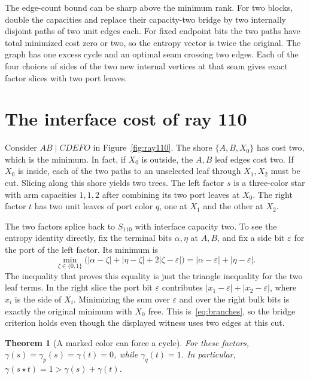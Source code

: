 \documentclass[11pt]{article}
\newtheorem{theorem}{Theorem}[section]
\newcommand{\ray}{S_{110}}
\begin{document}
The edge-count bound can be sharp above the minimum rank. For two
blocks, double the capacities and replace their capacity-two bridge
by two internally disjoint paths of two unit edges each. For fixed
endpoint bits the two paths have total minimized cost zero or two,
so the entropy vector is twice the original. The graph has one excess
cycle and an optimal seam crossing two edges. Each of the four choices
of sides of the two new internal vertices at that seam gives exact
factor slices with two port leaves.

\section{The interface cost of ray 110}
\label{sec:interface}

Consider \(AB\mid CDEFO\) in Figure~\ref{fig:ray110}. The shore
\(\{A,B,X_0\}\) has cost two, which is the minimum. In fact, if \(X_0\)
is outside, the \(A,B\) leaf edges cost two. If \(X_0\) is inside,
each of the two paths to an unselected leaf through \(X_1,X_2\) must
be cut. Slicing along this shore yields two trees. The left factor \(s\)
is a three-color star with arm capacities \(1,1,2\) after combining
its two port leaves at \(X_0\). The right factor \(t\) has two
unit leaves of port color \(q\), one at \(X_1\) and the other at \(X_2\).

The two factors splice back to \(\ray\) with interface capacity two.
To see the entropy identity directly, fix the terminal bits
\(\alpha,\eta\) at \(A,B\), and fix a side bit \(\varepsilon\) for
the port of the left factor. Its minimum is
\[
 \min_{\zeta\in\{0,1\}}
 \bigl(|\alpha-\zeta|+|\eta-\zeta|+2|\zeta-\varepsilon|\bigr)
 =|\alpha-\varepsilon|+|\eta-\varepsilon|.
\]
The inequality that proves this equality is just the triangle
inequality for the two leaf terms. In the right slice the port bit
\(\varepsilon\) contributes
\(|x_1-\varepsilon|+|x_2-\varepsilon|\), where \(x_i\) is the side of
\(X_i\). Minimizing the sum over \(\varepsilon\) and over the right
bulk bits is exactly the original minimum with \(X_0\) free.
This is~\eqref{eq:branches}, so the bridge criterion holds even
though the displayed witness uses two edges at this cut.

\begin{theorem}[A marked color can force a cycle]
\label{thm:portcost}
For these factors, \(\gamma(s)=\gamma_p(s)=\gamma(t)=0\), while
\(\gamma_q(t)=1\). In particular,
\(\gamma(s\star t)=1>\gamma(s)+\gamma(t)\).
\end{theorem}
\end{document}
